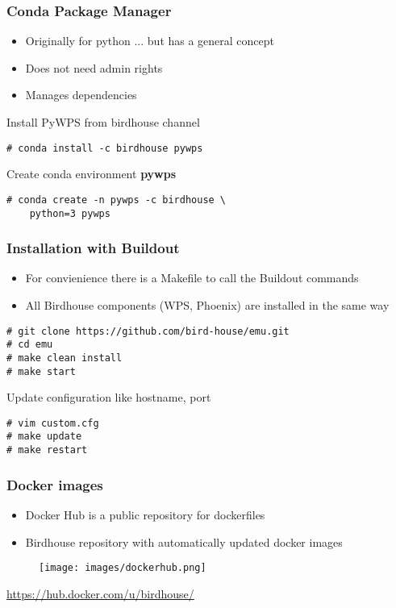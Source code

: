 \documentclass{beamer}
\begin{document}
\begin{frame}[fragile]
  \frametitle<presentation>{Conda Package Manager}
  \begin{itemize}
    \item Originally for python ... but has a general concept
    \item Does not need admin rights
    \item Manages dependencies
  \end{itemize}
  Install PyWPS from birdhouse channel
    \begin{verbatim}
# conda install -c birdhouse pywps
    \end{verbatim}
  Create conda environment \textbf{pywps}
    \begin{verbatim}
# conda create -n pywps -c birdhouse \
    python=3 pywps
    \end{verbatim}
\end{frame}

\begin{frame}[fragile]
  \frametitle<presentation>{Installation with Buildout}
  \begin{itemize}
    \item For convienience there is a Makefile to call the Buildout commands
    \item All Birdhouse components (WPS, Phoenix) are installed in the same way
  \end{itemize}
    \begin{verbatim}
# git clone https://github.com/bird-house/emu.git
# cd emu
# make clean install
# make start
    \end{verbatim}
  Update configuration like hostname, port
    \begin{verbatim}
# vim custom.cfg
# make update
# make restart
    \end{verbatim}
\end{frame}

\begin{frame}
\frametitle<presentation>{Docker images}

\begin{itemize}
  \item Docker Hub is a public repository for dockerfiles
  \item Birdhouse repository with automatically updated docker images
\end{itemize}

  \begin{figure}[ht]
   \centering
   \texttt{[image: images/dockerhub.png]}
  \end{figure}

\vspace{0.2cm}
\centering
\footnotesize{\url{https://hub.docker.com/u/birdhouse/}}

\end{frame}
\end{document}
